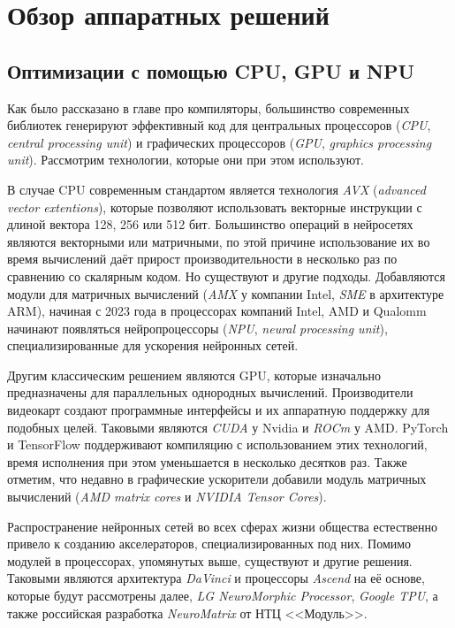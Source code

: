 \section{Обзор аппаратных решений}
\label{sec:Chapter6} 

\subsection{Оптимизации с помощью CPU, GPU и NPU}

Как было рассказано в главе про компиляторы, большинство современных библиотек
генерируют эффективный код для центральных процессоров (\textit{CPU},
\textit{central processing unit}) и графических процессоров (\textit{GPU},
\textit{graphics processing unit}). Рассмотрим технологии, которые они при
этом используют.

В случае CPU современным стандартом является технология \textit{AVX}
(\textit{advanced vector extentions}), которые позволяют использовать векторные
инструкции с длиной вектора 128, 256 или 512 бит. Большинство операций в
нейросетях являются векторными или матричными, по этой причине использование
их во время вычислений даёт прирост производительности в несколько раз по
сравнению со скалярным кодом. Но существуют и другие подходы. Добавляются
модули для матричных вычислений (\textit{AMX} у компании Intel, \textit{SME} в
архитектуре ARM), начиная с 2023 года в процессорах компаний Intel, AMD и
Qualomm начинают появляться нейропроцессоры (\textit{NPU},
\textit{neural processing unit}), специализированные для ускорения нейронных
сетей.

Другим классическим решением являются GPU, которые изначально предназначены
для параллельных однородных вычислений. Производители видеокарт создают
программные интерфейсы и их аппаратную поддержку для подобных целей. Таковыми
являются \textit{CUDA} у Nvidia и \textit{ROCm} у AMD. PyTorch и TensorFlow
поддерживают компиляцию с использованием этих технологий, время исполнения при
этом уменьшается в несколько десятков раз. Также отметим, что недавно в
графические ускорители добавили модуль матричных вычислений
(\textit{AMD matrix cores} и \textit{NVIDIA Tensor Cores}).

Распространение нейронных сетей во всех сферах жизни общества естественно
привело к созданию акселераторов, специализированных под них. Помимо модулей
в процессорах, упомянутых выше, существуют и другие решения. Таковыми являются
архитектура \textit{DaVinci} и процессоры \textit{Ascend} на её основе, которые
будут рассмотрены далее, \textit{LG NeuroMorphic Processor},
\textit{Google TPU}, а также российская разработка \textit{NeuroMatrix} от
НТЦ <<Модуль>>.

